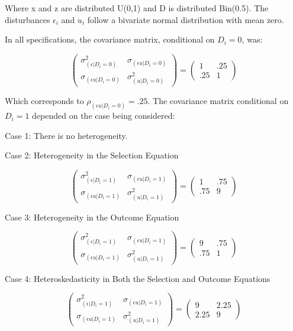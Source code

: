 \documentclass{article}
\begin{document}
\noindent Where x and z are distributed U(0,1) and D is distributed Bin(0.5).  The disturbances $\epsilon_i$ and $u_i$ follow a bivariate normal distribution with mean zero.  

In all specifications, the covariance matrix, conditional on $D_i=0$, was:

\[\left( \begin{array}{cc}
\sigma_{(\epsilon|D_i=0)}^2 & \sigma_{(\epsilon u|D_i=0)} \\
\sigma_{(\epsilon u|D_i=0)} & \sigma_{(u|D_i=0)}^2  \end{array} \right) 
=
\left( \begin{array}{cc}
1 & .25 \\
.25 & 1  \end{array} \right)\] 

\noindent Which corresponds to $\rho_{(\epsilon u|D_i=0)}=.25$.  The covariance matrix conditional on $D_i=1$ depended on the case being considered:

Case 1: There is no heterogeneity.

Case 2: Heterogeneity in the Selection Equation

\[\left( \begin{array}{cc}
\sigma_{(\epsilon|D_i=1)}^2 & \sigma_{(\epsilon u|D_i=1)} \\
\sigma_{(\epsilon u|D_i=1)} & \sigma_{(u|D_i=1)}^2  \end{array} \right) 
=
\left( \begin{array}{cc}
1 & .75 \\
.75 & 9  \end{array} \right)\] 

Case 3: Heterogeneity in the Outcome Equation

\[\left( \begin{array}{cc}
\sigma_{(\epsilon|D_i=1)}^2 & \sigma_{(\epsilon u|D_i=1)} \\
\sigma_{(\epsilon u|D_i=1)} & \sigma_{(u|D_i=1)}^2  \end{array} \right) 
=
\left( \begin{array}{cc}
9 & .75 \\
.75 & 1  \end{array} \right)\] 

Case 4: Heteroskedasticity in Both the Selection and Outcome Equations

\[\left( \begin{array}{cc}
\sigma_{(\epsilon|D_i=1)}^2 & \sigma_{(\epsilon u|D_i=1)} \\
\sigma_{(\epsilon u|D_i=1)} & \sigma_{(u|D_i=1)}^2  \end{array} \right) 
=
\left( \begin{array}{cc}
9 & 2.25 \\
2.25 & 9  \end{array} \right)\]
\end{document}
